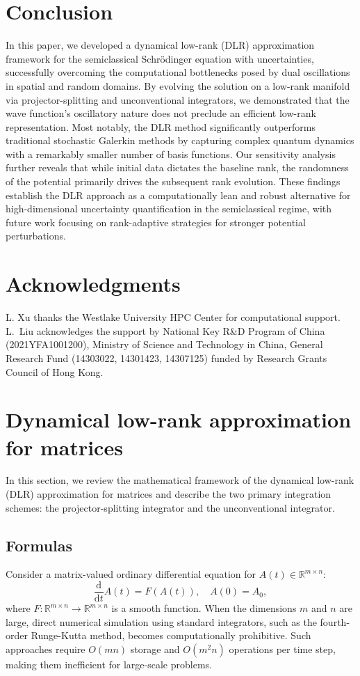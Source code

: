 \documentclass[preprint,11pt]{elsarticle}
\begin{document}
\section{Conclusion}
\label{Sec: conclusion}

In this paper, we developed a dynamical low-rank (DLR) approximation framework for the semiclassical Schrödinger equation with uncertainties, successfully overcoming the computational bottlenecks posed by dual oscillations in spatial and random domains. By evolving the solution on a low-rank manifold via projector-splitting and unconventional integrators, we demonstrated that the wave function's oscillatory nature does not preclude an efficient low-rank representation. Most notably, the DLR method significantly outperforms traditional stochastic Galerkin methods by capturing complex quantum dynamics with a remarkably smaller number of basis functions. Our sensitivity analysis further reveals that while initial data dictates the baseline rank, the randomness of the potential primarily drives the subsequent rank evolution. These findings establish the DLR approach as a computationally lean and robust alternative for high-dimensional uncertainty quantification in the semiclassical regime, with future work focusing on rank-adaptive strategies for stronger potential perturbations.
\section*{Acknowledgments}
L. Xu thanks the Westlake University HPC Center for computational support. L.~Liu acknowledges the support by National Key R\&D Program of China (2021YFA1001200), Ministry of Science and Technology in China, General Research Fund (14303022, 14301423, 14307125) funded by Research Grants Council of Hong Kong.


\appendix
\section{Dynamical low-rank approximation for matrices}
\label{Sec: DLR_matrix}

In this section, we review the mathematical framework of the dynamical low-rank (DLR) approximation for matrices and describe the two primary integration schemes: the projector-splitting integrator and the unconventional integrator.

\subsection{Formulas}
Consider a matrix-valued ordinary differential equation for $A(t)\in\mathbb{R}^{m\times n}$:
\begin{equation}
    \frac{\mathrm{d}}{\mathrm{d}t}A(t)=F(A(t)),\quad A(0)=A_0,
\end{equation}
where $F:\mathbb{R}^{m\times n}\rightarrow\mathbb{R}^{m\times n}$ is a smooth function. When the dimensions $m$ and $n$ are large, direct numerical simulation using standard integrators, such as the fourth-order Runge-Kutta method, becomes computationally prohibitive. Such approaches require $O(mn)$ storage and $O(m^2n)$ operations per time step, making them inefficient for large-scale problems.
\end{document}
